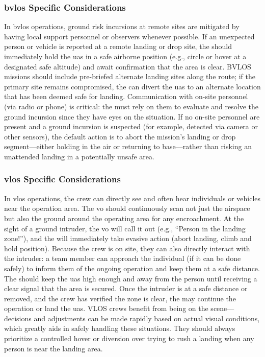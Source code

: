             \subsubsection{\ac{bvlos} Specific Considerations} In \ac{bvlos} operations, ground risk incursions at remote sites are mitigated by having local support personnel or observers whenever possible. If an unexpected person or vehicle is reported at a remote landing or drop site, the  should immediately hold the \ac{uas} in a safe airborne position (e.g., circle or hover at a designated safe altitude) and await confirmation that the area is clear. BVLOS missions should include pre-briefed alternate landing sites along the route; if the primary site remains compromised, the  can divert the \ac{uas} to an alternate location that has been deemed safe for landing. Communication with on-site personnel (via radio or phone) is critical: the  must rely on them to evaluate and resolve the ground incursion since they have eyes on the situation. If no on-site personnel are present and a ground incursion is suspected (for example, detected via camera or other sensors), the default action is to abort the mission’s landing or drop segment—either holding in the air or returning to base—rather than risking an unattended landing in a potentially unsafe area.
            
            \subsubsection{\ac{vlos} Specific Considerations} In \ac{vlos} operations, the crew can directly see and often hear individuals or vehicles near the operation area. The \ac{vo} should continuously scan not just the airspace but also the ground around the operating area for any encroachment. At the sight of a ground intruder, the \ac{vo} will call it out (e.g., “Person in the landing zone!”), and the  will immediately take evasive action (abort landing, climb and hold position). Because the crew is on site, they can also directly interact with the intruder: a team member can approach the individual (if it can be done safely) to inform them of the ongoing operation and keep them at a safe distance. The  should keep the \ac{uas} high enough and away from the person until receiving a clear signal that the area is secured. Once the intruder is at a safe distance or removed, and the crew has verified the zone is clear, the  may continue the operation or land the \ac{uas}. VLOS crews benefit from being on the scene—decisions and adjustments can be made rapidly based on actual visual conditions, which greatly aids in safely handling these situations. They should always prioritize a controlled hover or diversion over trying to rush a landing when any person is near the landing area.
            
